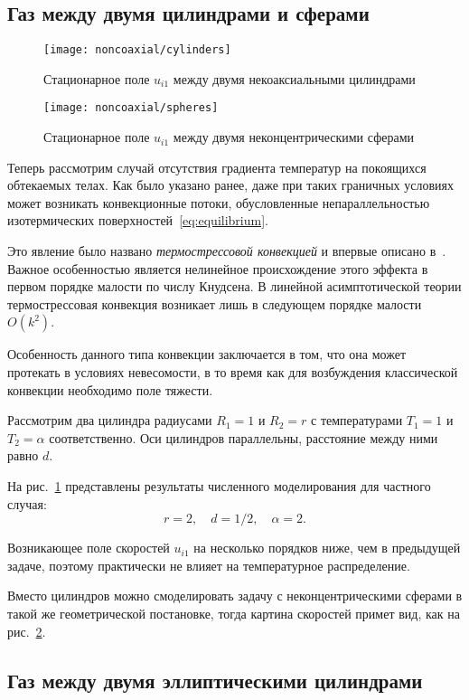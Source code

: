 \documentclass[english,russian,a4paper,10pt]{article}
\begin{document}
\subsection{Газ между двумя цилиндрами и сферами}

\begin{figure}[ht]
	\centering
	\texttt{[image: noncoaxial/cylinders]}
	\caption{Стационарное поле \(u_{i1}\) между двумя некоаксиальными цилиндрами}\label{fig:cylinders}
\end{figure}

\begin{figure}
	\centering
	\texttt{[image: noncoaxial/spheres]}
	\caption{Стационарное поле \(u_{i1}\) между двумя неконцентрическими сферами}\label{fig:spheres}
\end{figure}

Теперь рассмотрим случай отсутствия градиента температур на покоящихся обтекаемых телах.
Как было указано ранее, даже при таких граничных условиях может возникать конвекционные потоки,
обусловленные непараллельностью изотермических поверхностей~\eqref{eq:equilibrium}.

Это явление было названо \textit{термострессовой конвекцией} и впервые описано в~\cite{Kogan1971}.
Важное особенностью является нелинейное происхождение этого эффекта в первом порядке малости по числу Кнудсена.
В линейной асимптотической теории термострессовая конвекция возникает лишь в следующем порядке малости \(O(k^2)\).

Особенность данного типа конвекции заключается в том, что она может протекать в условиях невесомости,
в то время как для возбуждения классической конвекции необходимо поле тяжести.

Рассмотрим два цилиндра радиусами \(R_1=1\) и \(R_2=r\)
с температурами \(T_1=1\) и \(T_2=\alpha\) соответственно.
Оси цилиндров параллельны, расстояние между ними равно \(d\).

На рис.~\ref{fig:cylinders} представлены результаты численного моделирования для частного случая:
\[ r = 2, \quad d = 1/2, \quad \alpha = 2.\]

Возникающее поле скоростей \(u_{i1}\) на несколько порядков ниже, чем в предыдущей задаче, поэтому практически не влияет на температурное распределение.

Вместо цилиндров можно смоделировать задачу с неконцентрическими сферами в такой же геометрической постановке,
тогда картина скоростей примет вид, как на рис.~\ref{fig:spheres}.

\subsection{Газ между двумя эллиптическими цилиндрами}
\end{document}
